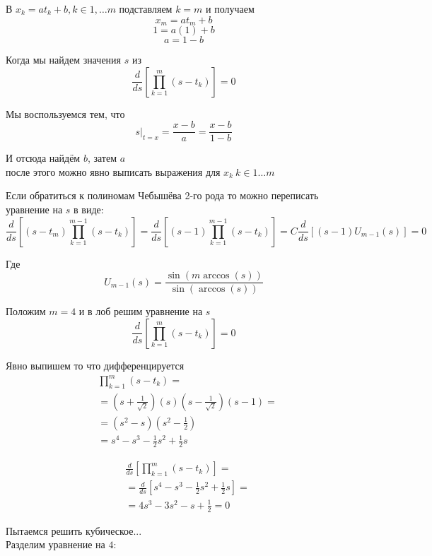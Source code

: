 \documentclass[12pt,a4paper]{article}
\begin{document}
	\noindent В $x_k = a t_{k} + b, k \in 1, \ldots m$ подставляем $k=m$ и получаем
	\[
	x_m = a t_m + b
	\]
	\[
	1 = a (1) + b
	\]
	\[
	a = 1 - b
	\]
	
	\noindent Когда мы найдем значения $s$ из
	\[
	\frac{d}{ds} \left[\prod_{k=1}^{m} \left( s - t_{k} \right) \right] = 0
	\]
	
	\noindent Мы воспользуемся тем, что
	\[
	s |_{t=x} = \frac{x-b}{a} = \frac{x-b}{1 - b}
	\]
	
	\noindent И отсюда найдём $b$, затем $a$ \\
	после этого можно явно выписать выражения для $x_k \  k \in 1 \ldots m$
	
	
	\noindent Если обратиться к полиномам Чебышёва 2-го рода то можно переписать уравнение на $s$ в виде:
	\[
	\frac{d}{ds} \left[ (s-t_m) \prod_{k=1}^{m-1} \left( s - t_{k} \right) \right] = 
	\frac{d}{ds} \left[ (s-1) \prod_{k=1}^{m-1} \left( s - t_{k} \right) \right] = 
	C \frac{d}{ds} \left[ (s-1) U_{m-1}(s) \right] = 0
	\]
	
	\noindent Где
	\[
	U_{m-1}(s) = \frac{\sin(m \arccos(s))}{\sin(\arccos(s))}
	\]
	
	\noindent Положим $m=4$ и в лоб решим уравнение на $s$
	\[
	\frac{d}{ds} \left[\prod_{k=1}^{m} \left( s - t_{k} \right) \right] = 0
	\]
	
	\noindent Явно выпишем то что дифференцируется
	\begin{align*}
		&\prod_{k=1}^{m} \left( s - t_{k} \right) = \\
		&=  \left(s + \frac{1}{\sqrt2} \right) (s)  \left(s - \frac{1}{\sqrt2} \right)  (s - 1) = \\
		&= (s^2 - s) \left( s^2 - \frac{1}{2} \right) \\
		&= s^4 - s^3 - \frac{1}{2}s^2 + \frac{1}{2}s
	\end{align*}
	
	\begin{align*}
		&\frac{d}{ds} \left[\prod_{k=1}^{m} \left( s - t_{k} \right) \right] = \\ 
		&= \frac{d}{ds} \left[ s^4 - s^3 - \frac{1}{2}s^2 + \frac{1}{2}s \right] = \\
		&= 4s^3 - 3s^2 - s + \frac{1}{2} = 0
	\end{align*}
	
	\newpage
	
	\noindent Пытаемся решить кубическое...\\
	
	Разделим уравнение на $4$:
	
\end{document}
